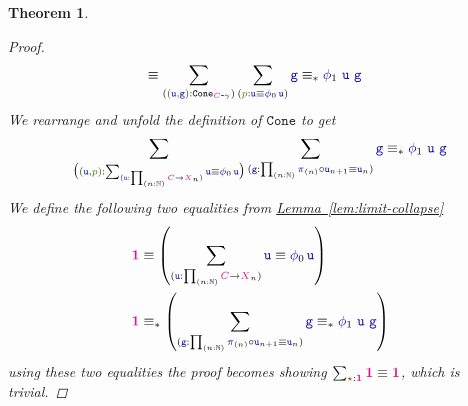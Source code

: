 \documentclass[twoside,11pt,openright]{report}
\theoremstyle{plain} %
\newtheorem{thm}{Theorem}[section]
\theoremstyle{definition}
\theoremstyle{remark}
\newcommand*{\lemref}[1]{\hyperref[lem:#1]{Lemma~\ref*{lem:#1}}}
\newcommand*{\term}[1]{\textcolor{green!30!black}{#1}} %
\newcommand*{\pathterm}[1]{\textcolor{green!65!red!75!black}{#1}}
\newcommand*{\type}[1]{\textcolor{magenta!90!black}{#1}}
\newcommand*{\unit}{\type{\textbf{1}}}
\newcommand*{\coalg}[2]{#1\texttt{-}#2}
\newcommand*{\constant}[1]{\textcolor{orange!60!black}{\ensuremath{\mathtt{#1}}}}
\newcommand*{\function}[1]{\textcolor{blue!60!black}{\ensuremath{\mathtt{#1}}}}
\newcommand*{\typeformer}[1]{\ensuremath{\mathtt{#1}}}
\newcommand*{\unitelem}{\constant{\star}} %
\begin{document}
\begin{thm}
\begin{proof}
\begin{align}
    &\equiv \sum_{(\term{(\function{u},\function{g})} : \typeformer{Cone}_{\coalg{\type{C}}{\function{\gamma}}})} \sum_{(\pathterm{p} : \function{u} \equiv \function{\phi}_0\,\function{u})} \function{g} \equiv_{*} \function{\phi}_1~\function{u}~\function{g}
  \end{align}
  We rearrange and unfold the definition of \(\typeformer{Cone}\) to get
  \begin{equation}
    \sum_{\big(\term{(\function{u},\pathterm{p})} : \sum_{(\function{u} : \prod_{(n:\mathbb{N})} \type{C} \rightarrow \type{X}_n)} \function{u} \equiv \function{\phi}_0\,\function{u}\big)} \sum_{(\function{g} : \prod_{(n:\mathbb{N})} \function{\pi}_{(n)} \circ \function{u}_{n+1} \equiv \function{u}_n)}\function{g} \equiv_{*} \function{\phi}_1~\function{u}~\function{g}
  \end{equation}
  We define the following two equalities from \lemref{limit-collapse}
  \begin{align}
    \unit &\equiv \left(\sum_{(\function{u} : \prod_{(n:\mathbb{N})} \type{C} \rightarrow \type{X}_n)} \function{u} \equiv \function{\phi}_0\,\function{u}\right)  \\
    \unit &\equiv_{*} \left(\sum_{(\function{g} : \prod_{(n:\mathbb{N})} \function{\pi}_{(n)} \circ \function{u}_{n+1} \equiv \function{u}_n)}\function{g} \equiv_{*} \function{\phi}_1~\function{u}~\function{g}\right)
  \end{align}
  using these two equalities the proof becomes showing \(\sum_{\unitelem : \unit} \unit \equiv \unit\), which is trivial.
  \end{proof}
\end{thm}
\end{document}
